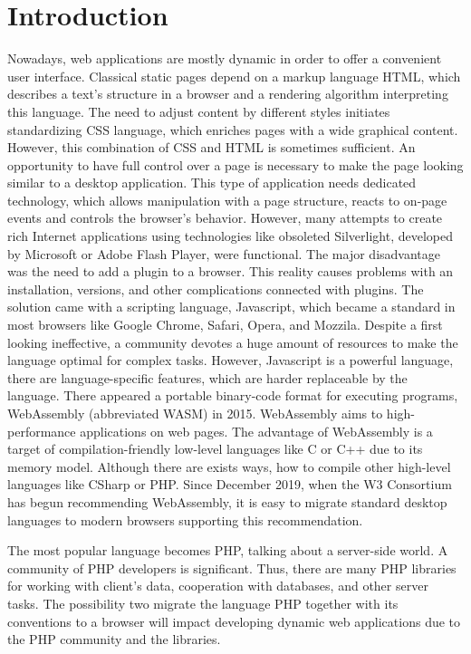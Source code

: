 \chapter*{Introduction}

Nowadays, web applications are mostly dynamic in order to offer a convenient user interface.
Classical static pages depend on a markup language HTML, which describes a text's structure in a browser and a rendering algorithm interpreting this language.
The need to adjust content by different styles initiates standardizing CSS language, which enriches pages with a wide graphical content.
However, this combination of CSS and HTML is sometimes sufficient. An opportunity to have full control over a page is necessary to make the page looking similar to a desktop application.
This type of application needs dedicated technology, which allows manipulation with a page structure, reacts to on-page events and controls the browser's behavior.
However, many attempts to create rich Internet applications using technologies like obsoleted Silverlight, developed by Microsoft or Adobe Flash Player, were functional. 
The major disadvantage was the need to add a plugin to a browser.
This reality causes problems with an installation, versions, and other complications connected with plugins.
The solution came with a scripting language, Javascript, which became a standard in most browsers like Google Chrome, Safari, Opera, and Mozzila.
Despite a first looking ineffective, a community devotes a huge amount of resources to make the language optimal for complex tasks.
However, Javascript is a powerful language, there are language-specific features, which are harder replaceable by the language.
There appeared a portable binary-code format for executing programs, WebAssembly (abbreviated WASM)  in 2015.
WebAssembly aims to high-performance applications on web pages.
The advantage of WebAssembly is a target of compilation-friendly low-level languages like C or C++ due to its memory model.
Although there are exists ways, how to compile other high-level languages like CSharp or PHP.
Since December 2019, when the W3 Consortium has begun recommending WebAssembly, it is easy to migrate standard desktop languages to modern browsers supporting this recommendation.

The most popular language becomes PHP, talking about a server-side world.
A community of PHP developers is significant.
Thus, there are many PHP libraries for working with client's data, cooperation with databases, and other server tasks.
The possibility two migrate the language PHP together with its conventions to a browser will impact developing dynamic web applications due to the PHP community and the libraries.

